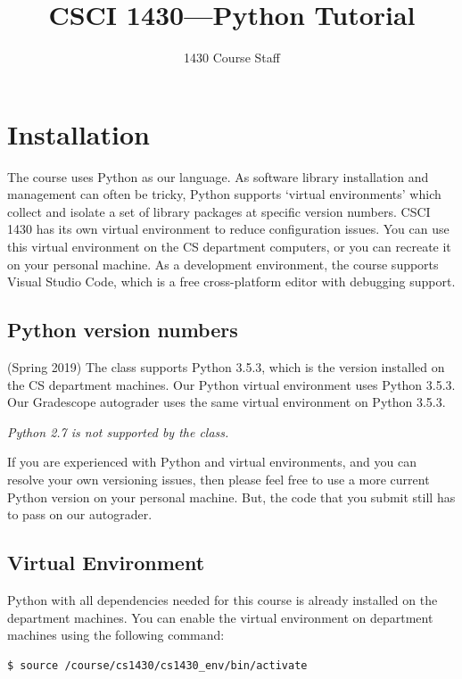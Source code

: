 \documentclass{article}
\date{}
\title{CSCI 1430---Python Tutorial}
\author{1430 Course Staff}
\begin{document}
\maketitle
\vspace{-2cm}
\thispagestyle{fancy}

\section{Installation}

The course uses Python as our language. As software library installation and management can often be tricky, Python supports `virtual environments' which collect and isolate a set of library packages at specific version numbers. CSCI 1430 has its own virtual environment to reduce configuration issues. You can use this virtual environment on the CS department computers, or you can recreate it on your personal machine. As a development environment, the course supports Visual Studio Code, which is a free cross-platform editor with debugging support.


\subsection{Python version numbers}

(Spring 2019) The class supports Python 3.5.3, which is the version installed on the CS department machines. Our Python virtual environment uses Python 3.5.3. Our Gradescope autograder uses the same virtual environment on Python 3.5.3.

\emph{Python 2.7 is not supported by the class.}

If you are experienced with Python and virtual environments, and you can resolve your own versioning issues, then please feel free to use a more current Python version on your personal machine. But, the code that you submit still has to pass on our autograder.


\subsection{Virtual Environment}

Python with all dependencies needed for this course is already installed on the department machines. You can enable the virtual environment on department machines using the following command:
\begin{verbatim}
$ source /course/cs1430/cs1430_env/bin/activate
\end{verbatim}
\end{document}
